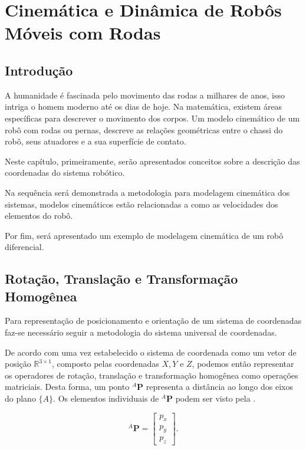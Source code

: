 \chapter{Cinemática e Dinâmica de Robôs Móveis com Rodas}


\section{Introdução}\label{intro}

A humanidade é fascinada pelo movimento das rodas a milhares de anos, isso intriga o homem moderno até os dias de hoje. Na matemática, existem áreas específicas para descrever o movimento dos corpos. Um modelo cinemático de um robô com rodas ou pernas, descreve as relações geométricas entre o chassi do robô, seus atuadores e a sua superfície de contato.

Neste capítulo, primeiramente, serão apresentados conceitos sobre a descrição das coordenadas do sistema robótico. 

Na sequência será demonstrada a metodologia para modelagem cinemática dos sistemas, modelos cinemáticos estão relacionadas a como as velocidades dos elementos do robô.

Por fim, será apresentado um exemplo de modelagem cinemática de um robô diferencial.

\section{Rotação, Translação e Transformação Homogênea}\label{rotacao}
 
Para representação de posicionamento e orientação de um sistema de coordenadas faz-se necessário seguir a metodologia do sistema universal de coordenadas.

De acordo com \cite{craig2009introduction} uma vez estabelecido o sistema de coordenada como um vetor de posição $\mathbb{R}^{3 \times 1}$, composto pelas coordenadas $X,Y$ e $Z$, podemos então representar os operadores de rotação, translação e transformação homogênea como operações matriciais. Desta forma, um ponto ${}^A\mathbf{P}$ representa a distância ao longo dos eixos do plano $\{A\}$. Os elementos individuais de ${}^A\mathbf{P}$ podem ser visto pela .

\begin{equation}\label{eq:cine1}
    {}^A\mathbf{P} = \begin{bmatrix}
    p_x\\ p_y \\ p_z
    \end{bmatrix}.
\end{equation}

